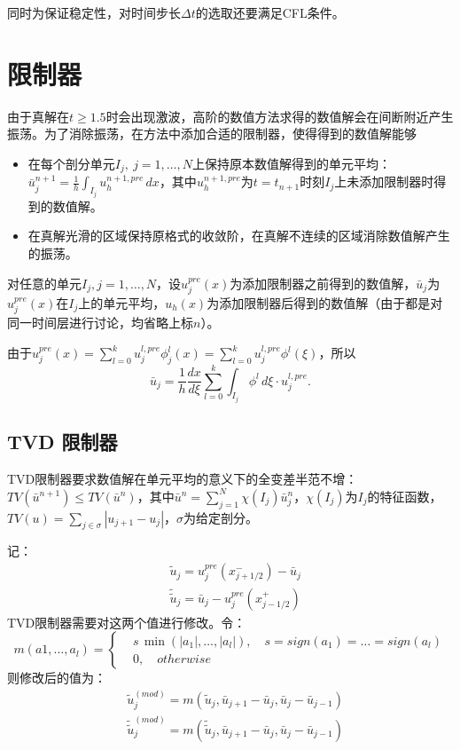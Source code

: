\documentclass[12pt, a4paper]{ctexart}
\begin{document}
	同时为保证稳定性，对时间步长$\Delta t$的选取还要满足CFL条件。
	
	\section{限制器}
	
	由于真解在$t \ge 1.5$时会出现激波，高阶的数值方法求得的数值解会在间断附近产生振荡。为了消除振荡，在方法中添加合适的限制器，使得得到的数值解能够
	\begin{itemize}
		\item 在每个剖分单元$I_j, \  j =1, \dots,N$上保持原本数值解得到的单元平均：$ \bar{u}_j^{n+1} = \frac{1}{h} \int_{I_j} u_h^{n+1, pre} \, dx$，其中$u_h^{n+1,pre}$为$t=t_{n+1}$时刻$I_j$上未添加限制器时得到的数值解。
		
		\item 在真解光滑的区域保持原格式的收敛阶，在真解不连续的区域消除数值解产生的振荡。
	\end{itemize}
	
	对任意的单元$I_j, j = 1, \dots, N$，设$u_j^{pre}(x)$为添加限制器之前得到的数值解，$\bar{u}_j$为$u_j^{pre}(x)$在$I_j$上的单元平均，$u_h(x)$为添加限制器后得到的数值解（由于都是对同一时间层进行讨论，均省略上标$n$）。
	
	由于$u_j^{pre} (x) = \sum_{l=0}^k u_j^{l,pre} \phi_j^l(x) = \sum_{l=0}^k u_j^{l,pre} \phi^l(\xi)$，所以
	$$
	\bar{u}_j = \frac{1}{h} \frac{dx}{d\xi} \sum_{l=0}^k \int_{I_j} \phi^l \, d\xi \cdot u_j^{l,pre}.
	$$
	
	\subsection{TVD 限制器}
	
	TVD限制器要求数值解在单元平均的意义下的全变差半范不增：$TV(\bar{u}^{n+1}) \leq TV(\bar{u}^n)$，其中$\bar{u}^n = \sum_{j=1}^N \chi(I_j) \bar{u}_j^n$，$\chi(I_j)$为$I_j$的特征函数，$TV(u) =  \sum_{j \in \sigma} |u_{j+1} - u_j|$，$\sigma$为给定剖分。
	
	记：
	\begin{align*}
	& \tilde{u}_j = u_j^{pre}(x_{j+1/2}^-) - \bar{u}_j\\
	& \tilde{\tilde{u}}_j = \bar{u}_j - u_j^{pre}(x_{j-1/2}^+)
	\end{align*}
	TVD限制器需要对这两个值进行修改。令：
	\begin{equation*}
	m(a1, \dots, a_l) = 
	\begin{cases}
	& s \, \min(|a_1|, \dots, |a_l|), \quad s = sign(a_1) = \dots = sign(a_l)\\
	& 0 , \quad otherwise
	\end{cases}
	\end{equation*}
	则修改后的值为：
	\begin{align*}
	& \tilde{u}_j^{(mod)} = m ( \tilde{u}_j, \bar{u}_{j+1} - \bar{u}_j, \bar{u}_j - \bar{u}_{j-1}) \\
	& \tilde{\tilde{u}}_j^{(mod)} = m ( \tilde{ \tilde{u}}_j, \bar{u}_{j+1} - \bar{u}_j, \bar{u}_j - \bar{u}_{j-1})
	\end{align*}
	
\end{document}
